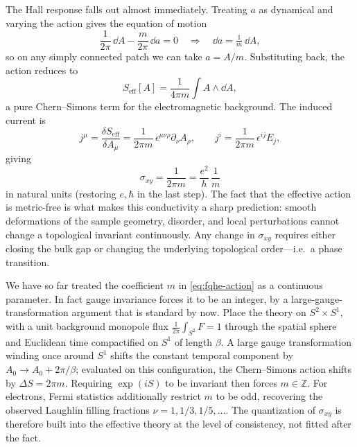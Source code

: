 The Hall response falls out almost immediately. Treating $a$ as dynamical and varying the action gives the equation of motion
\begin{equation}
  \frac{1}{2\pi}\,\dd A - \frac{m}{2\pi}\,\dd a = 0
  \quad\Longrightarrow\quad
  \dd a = \tfrac{1}{m}\,\dd A,
  \label{eq:fqhe-eom}
\end{equation}
so on any simply connected patch we can take $a = A/m$. Substituting back, the action reduces to
\begin{equation}
  S_{\mathrm{eff}}[A]
  =
  \frac{1}{4\pi m}\int A\wedge\dd A,
  \label{eq:fqhe-effective-action}
\end{equation}
a pure Chern--Simons term for the electromagnetic background. The induced current is
\begin{equation}
  j^\mu
  = \frac{\delta S_{\mathrm{eff}}}{\delta A_\mu}
  = \frac{1}{2\pi m}\,\epsilon^{\mu\nu\rho}\partial_\nu A_\rho,
  \qquad
  j^i = \frac{1}{2\pi m}\,\epsilon^{ij}E_j,
  \label{eq:fqhe-current}
\end{equation}
giving
\begin{equation}
  \sigma_{xy} = \frac{1}{2\pi m} = \frac{e^2}{h}\,\frac{1}{m}
  \label{eq:fqhe-conductance-derived}
\end{equation}
in natural units (restoring $e,\hbar$ in the last step). The fact that the effective action is metric-free is what makes this conductivity a sharp prediction: smooth deformations of the sample geometry, disorder, and local perturbations cannot change a topological invariant continuously. Any change in $\sigma_{xy}$ requires either closing the bulk gap or changing the underlying topological order---i.e.\ a phase transition.

We have so far treated the coefficient $m$ in \eqref{eq:fqhe-action} as a continuous parameter. In fact gauge invariance forces it to be an integer, by a large-gauge-transformation argument that is standard by now. Place the theory on $S^{2}\times S^{1}$, with a unit background monopole flux $\frac{1}{2\pi}\int_{S^{2}}F=1$ through the spatial sphere and Euclidean time compactified on $S^{1}$ of length $\beta$. A large gauge transformation winding once around $S^{1}$ shifts the constant temporal component by $A_0\to A_0+2\pi/\beta$; evaluated on this configuration, the Chern--Simons action shifts by $\Delta S = 2\pi m$. Requiring $\exp(iS)$ to be invariant then forces $m\in\mathbb{Z}$. For electrons, Fermi statistics additionally restrict $m$ to be odd, recovering the observed Laughlin filling fractions $\nu=1,1/3,1/5,\ldots$. The quantization of $\sigma_{xy}$ is therefore built into the effective theory at the level of consistency, not fitted after the fact.

